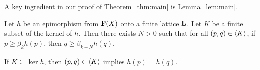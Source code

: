 A key ingredient in our proof of Theorem~\ref{thm:main} is Lemma~\ref{lem:main}.


\begin{lemma}\label{lem:main}
Let $h$ be an epimorphism from $\mathbf{F}(X)$ onto a finite lattice $\mathbf{L}$.
Let $K$ be a finite subset of the kernel of $h$.
Then there exists $N>0$ such that for all $(p,q) \in \langle K\rangle$, if $p\geq \beta_k h(p)$,
then $q \geq \beta_{k+N}h(q)$.
\end{lemma}

\begin{remark}
If $K \subseteq \ker h$, then $(p,q) \in \langle K\rangle$ implies $h(p) = h(q)$. 
\end{remark}
  
